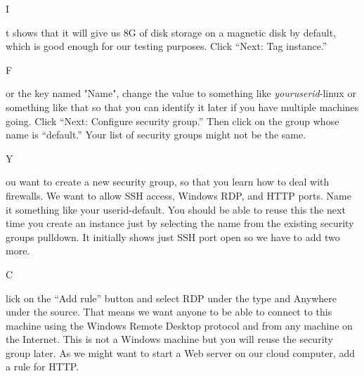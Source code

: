 \documentclass[titlepage]{tufte-book}
\newcounter{problem}
\newcommand{\step}[1]{{}
\vspace{4pt} \noindent {\bf \theproblem. }#1\addtocounter{problem}{1}}
\begin{document}
\begin{fullwidth}
\step It shows that it will give us 8G of disk storage on a magnetic disk by default, which is good enough for our testing purposes.  Click ``Next: Tag instance.''


\step For the key named "Name", change the value to something like {\em youruserid}-linux or something like that so that you can identify it later if you have multiple machines going. Click ``Next: Configure security group.'' Then click on the group whose name is ``default.'' Your list of security groups might not be the same.


\step You want to create a new security group, so that you learn how to deal with firewalls. We want to allow SSH access, Windows RDP, and HTTP ports.   Name it something like your userid-default. You should be able to reuse this the next time you create an instance just by selecting the name from the existing security groups pulldown. It initially shows just SSH port open so we have to add two more. 


\step Click on the ``Add rule'' button and select RDP under the type and Anywhere under the source. That means we want anyone to be able to connect to this machine using the Windows Remote Desktop protocol and from any machine on the Internet. This is not a Windows machine but you will reuse the security group later. As we might want to start a Web server on our cloud computer, add a rule for HTTP.



\end{fullwidth}
\end{document}
